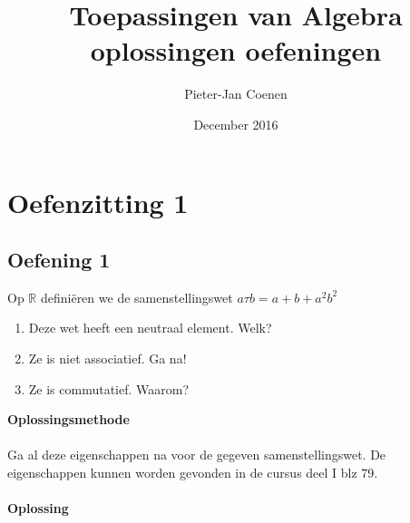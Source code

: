\documentclass[11pt,a4paper,titlepage]{article}
\title{Toepassingen van Algebra oplossingen oefeningen}
\author{Pieter-Jan Coenen}
\date{December 2016}
\begin{document}
\maketitle
\newpage
\tableofcontents
\newpage

\section{Oefenzitting 1}
\subsection{Oefening 1}
Op $ \mathbb{R} $ definiëren we de samenstellingswet $a\tau b = a+b+a^2 b^2$
\begin{enumerate}[label=(\alph*)]
\item Deze wet heeft een neutraal element. Welk?
\item Ze is niet associatief. Ga na!
\item Ze is commutatief. Waarom?
\end{enumerate}
\textbf{Oplossingsmethode} \\ \\
Ga al deze eigenschappen na voor de gegeven samenstellingswet. De eigenschappen kunnen worden gevonden in de cursus deel I blz 79. \\ \\
\textbf{Oplossing} \\
\end{document}
